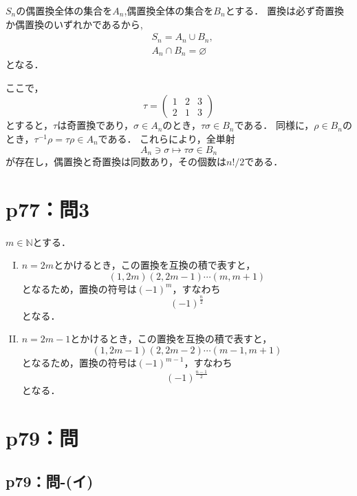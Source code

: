 \begin{tproof}
  $S_n$の偶置換全体の集合を$A_n$,偶置換全体の集合を$B_n$とする．
  置換は必ず奇置換か偶置換のいずれかであるから,
  \begin{align*}
     & S_n = A_n \cup B_n ,       \\
     & A_n \cap B_n = \varnothing
  \end{align*}
  となる．

  ここで，
  \[
    \tau = \begin{pmatrix} 1 & 2 & 3 \\ 2 & 1 & 3 \end{pmatrix}
  \]
  とすると，$\tau$は奇置換であり，$\sigma \in  A_n$のとき，$ \tau \sigma \in B_n$である．
  同様に，$ \rho  \in B_n$のとき，$\tau^{-1} \rho = \tau \rho \in A_n$である．
  これらにより，全単射
  \[
    A_n \ni \sigma \mapsto \tau \sigma \in B_n
  \]
  が存在し，偶置換と奇置換は同数あり，その個数は$n! /2$である．
\end{tproof}


\section*{p77：問3}

\begin{tanswer}
  $m \in \mathbb{N}$とする．
  \begin{enumerate}[(I)]
    \item $n=2m$とかけるとき，この置換を互換の積で表すと，
          \[
            (1,2m)(2,2m-1) \dotsm (m,m+1)
          \]
          となるため，置換の符号は$(-1)^m$，すなわち
          \[
            (-1)^{\frac{n}{2}}
          \]
          となる．
    \item $n=2m-1$とかけるとき，この置換を互換の積で表すと，
          \[
            (1,2m-1)(2,2m-2) \dotsm (m-1,m+1)
          \]
          となるため，置換の符号は$(-1)^{m-1}$，すなわち
          \[
            (-1)^{\frac{n-1}{2}}
          \]
          となる．
  \end{enumerate}
\end{tanswer}




\section*{p79：問}


\subsection*{p79：問-(イ)}

